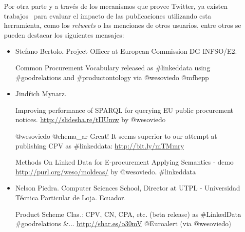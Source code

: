 Por otra parte y a través de los mecanismos que provee Twitter, ya existen trabajos~\cite{tweet-impact} para evaluar
el impacto de las publicaciones utilizando esta herramienta, como los \textit{retweets} o las menciones de otros
usuarios, entre otros se pueden destacar los siguientes mensajes:

\begin{itemize}

\item Stefano Bertolo. Project Officer at European Commission DG INFSO/E2.

\begin{Frame}
\begin{itshape}
Common Procurement Vocabulary released as \#linkeddata using \#goodrelations and \#productontology via @wesoviedo @mfhepp
\end{itshape}
\end{Frame}

\item Jindřich Mynarz.

\begin{Frame}
\begin{itshape}
Improving performance of SPARQL for querying EU public procurement notices. \url{http://slidesha.re/tIIUmw} by @wesoviedo
\end{itshape}
\end{Frame}


\begin{Frame}
\begin{itshape}
@wesoviedo @chema\_ar Great! It seems superior to our attempt at publishing CPV as \#linkeddata: \url{http://bit.ly/mTMmry}
\end{itshape}
\end{Frame}


\begin{Frame}
\begin{itshape}
Methods On Linked Data for E-procurement Applying Semantics - demo \url{http://purl.org/weso/moldeas/} by @wesoviedo. \#linkeddata
\end{itshape}
\end{Frame}


\item Nelson Piedra. Computer Sciences School, Director at UTPL - Universidad Técnica Particular de Loja. Ecuador.

\begin{Frame}
\begin{itshape}
Product Scheme Clas.: CPV, CN, CPA, etc. (beta release) as \#LinkedData \#goodrelations \&... \url{http://shar.es/o30mV} @Euroalert (via @wesoviedo)
\end{itshape}
\end{Frame}


\end{itemize}

